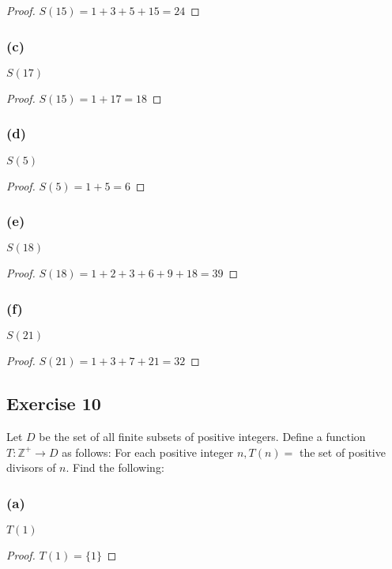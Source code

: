 \documentclass[14pt]{extarticle}
\newcommand{\Z}{\mathbb{Z}}
\begin{document}
\begin{proof}
    \(S(15) = 1 + 3 + 5 + 15 = 24\)
\end{proof}

\subsubsection{(c)}
$S(17)$

\begin{proof}
    \(S(15) = 1 + 17 = 18\)
\end{proof}

\subsubsection{(d)}
$S(5)$

\begin{proof}
    \(S(5) = 1 + 5 = 6\)
\end{proof}

\subsubsection{(e)}
$S(18)$

\begin{proof}
    \(S(18) = 1 + 2 + 3 + 6 + 9 + 18 = 39\)
\end{proof}

\subsubsection{(f)}
$S(21)$

\begin{proof}
    \(S(21) = 1 + 3 + 7 + 21 = 32\)
\end{proof}

\subsection{Exercise 10}
Let $D$ be the set of all finite subsets of positive integers. Define a function \(T: \Z^+ \to D\) as follows:
For each positive integer \(n, T(n) =\) the set of positive divisors of $n$. Find the following:

\subsubsection{(a)}
$T(1)$

\begin{proof}
    \(T(1) = \{1\}\)

\end{proof}
\end{document}
